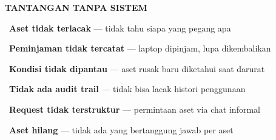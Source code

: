 \documentclass[a4paper]{article}
\begin{document}
\noindent
\begin{minipage}[t]{0.485\textwidth}
    \colorbox{RedLight}{%
        \begin{minipage}{\dimexpr\textwidth-14pt}
            \vspace{5pt}
            {\fontsize{10}{13}\selectfont\bfseries\color{RedText} TANTANGAN TANPA SISTEM}
            \vspace{5pt}
        \end{minipage}}
    \vspace{6pt}

    {\fontsize{9.5}{13}\selectfont\color{TextDark}%
    \textbullet\ \textbf{Aset tidak terlacak} --- tidak tahu siapa yang pegang apa\par\vspace{4pt}%
    \textbullet\ \textbf{Peminjaman tidak tercatat} --- laptop dipinjam, lupa dikembalikan\par\vspace{4pt}%
    \textbullet\ \textbf{Kondisi tidak dipantau} --- aset rusak baru diketahui saat darurat\par\vspace{4pt}%
    \textbullet\ \textbf{Tidak ada audit trail} --- tidak bisa lacak histori penggunaan\par\vspace{4pt}%
    \textbullet\ \textbf{Request tidak terstruktur} --- permintaan aset via chat informal\par\vspace{4pt}%
    \textbullet\ \textbf{Aset hilang} --- tidak ada yang bertanggung jawab per aset}%
\end{minipage}%
\hfill%
\end{document}
